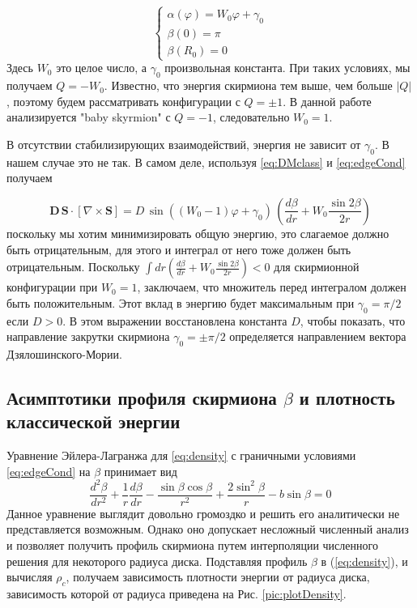 \documentclass[a4paper,article,14pt]{extarticle}
\begin{document}
\begin{equation}
\label{eq:edgeCond}
{\left\{ {\begin{array}{*{20}{c}}
  {\alpha \left( \varphi  \right) = {W_0}\varphi  + {\gamma _0}} \\ 
  {\beta (0) = \pi } \\ 
  {\beta ({R_0}) = 0} 
\end{array}} \right.}
\end{equation}
Здесь $W_0$ это целое число, а $\gamma _0$ произвольная константа. При таких условиях, мы получаем $Q=-W_0$. Известно, что энергия скирмиона тем выше, чем больше $|Q|$ \cite{rajaraman, belavin}, поэтому будем рассматривать конфигурации с $Q=\pm 1$. В данной работе анализируется "baby skyrmion" с $Q=-1$, следовательно $W_0 = 1$.

В отсутствии стабилизирующих взаимодействий, энергия не зависит от $\gamma_0$. В нашем случае это не так. В самом деле, используя \eqref{eq:DMclass} и \eqref{eq:edgeCond} получаем

\[\mathbf{D} \, {\mathbf{S}} \cdot \left[ {\nabla  \times {\mathbf{S}}} \right] = D \, \sin \left( {\left( {{W_0} - 1} \right) \varphi  + {\gamma _0}} \right)\,\left( {\frac{{d\beta }}{{dr}} + {W_0}\frac{{\sin 2\beta }}{{2r}}} \right)\]
поскольку мы хотим минимизировать общую энергию, это слагаемое должно быть отрицательным, для этого и интеграл от него тоже должен быть отрицательным. Поскольку $\int {d{r}} \left( {\frac{{d\beta }}{{dr}} + {W_0}\frac{{\sin 2\beta }}{{2r}}} \right) < 0$ для скирмионной конфигурации  при $W_0=1$,  заключаем, что множитель перед интегралом должен быть положительным. Этот вклад в энергию будет максимальным при $\gamma_0 = \pi/2$ если $D>0$. В этом выражении восстановлена константа $D$, чтобы показать, что направление закрутки скирмиона $\gamma_0 = \pm \pi/2$ определяется направлением вектора Дзялошинского-Мории.


\subsection{Асимптотики профиля скирмиона $\beta$ и плотность классической энергии }

Уравнение Эйлера-Лагранжа для \eqref{eq:density} с граничными условиями \eqref{eq:edgeCond} на $\beta$ принимает вид
\begin{equation}
\label{eq:eulerLagr}
\frac{{{d^2}\beta }}{{d{r^2}}} + \frac{1}{r}\frac{{d\beta }}{{dr}} - \frac{{\sin \beta \cos \beta }}{{{r^2}}} + \frac{{2{{\sin }^2}\beta }}{r} - b\sin \beta  = 0
\end{equation}
Данное уравнение выглядит довольно громоздко и решить его аналитически не представляется возможным. Однако оно допускает несложный численный анализ и позволяет получить профиль скирмиона путем интерполяции численного решения для некоторого радиуса диска.\cite{bogdanov} Подставляя профиль $\beta$ в (\ref{eq:density}), и вычисляя $\rho_c$, получаем зависимость плотности энергии от радиуса диска, зависимость которой от радиуса приведена на Рис. \ref{pic:plotDensity}.
\end{document}
